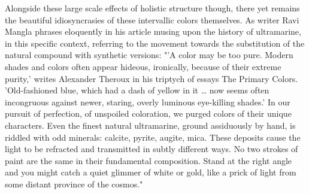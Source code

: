 Alongside these large scale effects of holistic structure though, there
yet remains the beautiful idiosyncrasies of these intervallic colors
themselves. As writer Ravi Mangla phrases eloquently in his article
musing upon the history of ultramarine, in this specific context,
referring to the movement towards the substitution of the natural
compound with synthetic versions: "'A color may be too pure. Modern
shades and colors often appear hideous, ironically, because of their
extreme purity,' writes Alexander Theroux in his triptych of essays The
Primary Colors. 'Old-fashioned blue, which had a dash of yellow in it
\ldots{} now seems often incongruous against newer, staring, overly
luminous eye-killing shades.' In our pursuit of perfection, of unspoiled
coloration, we purged colors of their unique characters. Even the finest
natural ultramarine, ground assiduously by hand, is riddled with odd
minerals: calcite, pyrite, augite, mica. These deposits cause the light
to be refracted and transmitted in subtly different ways. No two strokes
of paint are the same in their fundamental composition. Stand at the
right angle and you might catch a quiet glimmer of white or gold, like a
prick of light from some distant province of the cosmos."

